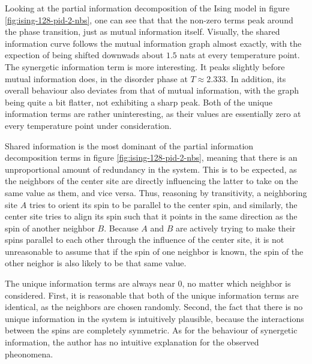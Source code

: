 \documentclass[12pt]{article}
\begin{document}
Looking at the partial information decomposition of the Ising model in figure \ref{fig:ising-128-pid-2-nbs}, one can see that that the non-zero terms peak around the phase transition, just as mutual information itself. Visually, the shared information curve follows the mutual information graph almost exactly, with the expection of being shifted downwads about $1.5$ nats at every temperature point. The synergetic information term is more interesting. It peaks slightly before mutual information does, in the disorder phase at $T \approx 2.333$. In addition, its overall behaviour also deviates from that of mutual information, with the graph being quite a bit flatter, not exhibiting a sharp peak. Both of the unique information terms are rather uninteresting, as their values are essentially zero at every temperature point under consideration. 

Shared information is the most dominant of the partial information decomposition terms in figure \ref{fig:ising-128-pid-2-nbs}, meaning that there is an unproportional amount of redundancy in the system. This is to be expected, as the neighbors of the center site are directly influencing the latter to take on the same value as them, and vice versa. Thus, reasoning by transitivity, a neighboring site $A$ tries to orient its spin to be parallel to the center spin, and similarly, the center site tries to align its spin such that it points in the same direction as the spin of another neighbor $B$. Because $A$ and $B$ are actively trying to make their spins parallel to each other through the influence of the center site, it is not unreasonable to assume that if the spin of one neighbor is known, the spin of the other neighor is also likely to be that same value. 

The unique information terms are always near 0, no matter which neighbor is considered. First, it is reasonable that both of the unique information terms are identical, as the neighbors are chosen randomly. Second, the fact that there is no unique information in the system is intuitively plausible, because the interactions between the spins are completely symmetric. As for the behaviour of synergetic information, the author has no intuitive explanation for the observed pheonomena. 
\end{document}
